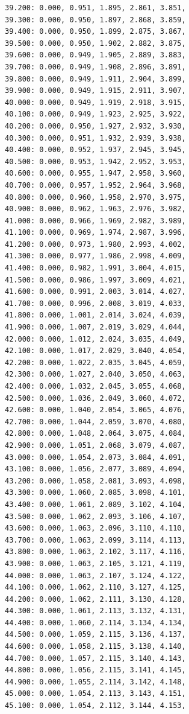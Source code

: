 \documentclass[12pt, a4paper]{article}
\begin{document}
\begin{scriptsize}
\begin{ttfamily}
\begin{lstlisting}
39.200: 0.000, 0.951, 1.895, 2.861, 3.851, 
39.300: 0.000, 0.950, 1.897, 2.868, 3.859, 
39.400: 0.000, 0.950, 1.899, 2.875, 3.867, 
39.500: 0.000, 0.950, 1.902, 2.882, 3.875, 
39.600: 0.000, 0.949, 1.905, 2.889, 3.883, 
39.700: 0.000, 0.949, 1.908, 2.896, 3.891, 
39.800: 0.000, 0.949, 1.911, 2.904, 3.899, 
39.900: 0.000, 0.949, 1.915, 2.911, 3.907, 
40.000: 0.000, 0.949, 1.919, 2.918, 3.915, 
40.100: 0.000, 0.949, 1.923, 2.925, 3.922, 
40.200: 0.000, 0.950, 1.927, 2.932, 3.930, 
40.300: 0.000, 0.951, 1.932, 2.939, 3.938, 
40.400: 0.000, 0.952, 1.937, 2.945, 3.945, 
40.500: 0.000, 0.953, 1.942, 2.952, 3.953, 
40.600: 0.000, 0.955, 1.947, 2.958, 3.960, 
40.700: 0.000, 0.957, 1.952, 2.964, 3.968, 
40.800: 0.000, 0.960, 1.958, 2.970, 3.975, 
40.900: 0.000, 0.962, 1.963, 2.976, 3.982, 
41.000: 0.000, 0.966, 1.969, 2.982, 3.989, 
41.100: 0.000, 0.969, 1.974, 2.987, 3.996, 
41.200: 0.000, 0.973, 1.980, 2.993, 4.002, 
41.300: 0.000, 0.977, 1.986, 2.998, 4.009, 
41.400: 0.000, 0.982, 1.991, 3.004, 4.015, 
41.500: 0.000, 0.986, 1.997, 3.009, 4.021, 
41.600: 0.000, 0.991, 2.003, 3.014, 4.027, 
41.700: 0.000, 0.996, 2.008, 3.019, 4.033, 
41.800: 0.000, 1.001, 2.014, 3.024, 4.039, 
41.900: 0.000, 1.007, 2.019, 3.029, 4.044, 
42.000: 0.000, 1.012, 2.024, 3.035, 4.049, 
42.100: 0.000, 1.017, 2.029, 3.040, 4.054, 
42.200: 0.000, 1.022, 2.035, 3.045, 4.059, 
42.300: 0.000, 1.027, 2.040, 3.050, 4.063, 
42.400: 0.000, 1.032, 2.045, 3.055, 4.068, 
42.500: 0.000, 1.036, 2.049, 3.060, 4.072, 
42.600: 0.000, 1.040, 2.054, 3.065, 4.076, 
42.700: 0.000, 1.044, 2.059, 3.070, 4.080, 
42.800: 0.000, 1.048, 2.064, 3.075, 4.084, 
42.900: 0.000, 1.051, 2.068, 3.079, 4.087, 
43.000: 0.000, 1.054, 2.073, 3.084, 4.091, 
43.100: 0.000, 1.056, 2.077, 3.089, 4.094, 
43.200: 0.000, 1.058, 2.081, 3.093, 4.098, 
43.300: 0.000, 1.060, 2.085, 3.098, 4.101, 
43.400: 0.000, 1.061, 2.089, 3.102, 4.104, 
43.500: 0.000, 1.062, 2.093, 3.106, 4.107, 
43.600: 0.000, 1.063, 2.096, 3.110, 4.110, 
43.700: 0.000, 1.063, 2.099, 3.114, 4.113, 
43.800: 0.000, 1.063, 2.102, 3.117, 4.116, 
43.900: 0.000, 1.063, 2.105, 3.121, 4.119, 
44.000: 0.000, 1.063, 2.107, 3.124, 4.122, 
44.100: 0.000, 1.062, 2.110, 3.127, 4.125, 
44.200: 0.000, 1.062, 2.111, 3.130, 4.128, 
44.300: 0.000, 1.061, 2.113, 3.132, 4.131, 
44.400: 0.000, 1.060, 2.114, 3.134, 4.134, 
44.500: 0.000, 1.059, 2.115, 3.136, 4.137, 
44.600: 0.000, 1.058, 2.115, 3.138, 4.140, 
44.700: 0.000, 1.057, 2.115, 3.140, 4.143, 
44.800: 0.000, 1.056, 2.115, 3.141, 4.145, 
44.900: 0.000, 1.055, 2.114, 3.142, 4.148, 
45.000: 0.000, 1.054, 2.113, 3.143, 4.151, 
45.100: 0.000, 1.054, 2.112, 3.144, 4.153, 

\end{lstlisting}
\end{ttfamily}
\end{scriptsize}
\end{document}
